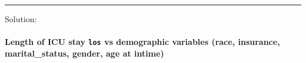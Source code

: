 \documentclass[
]{article}
\let\oldparagraph\paragraph
\renewcommand{\paragraph}[1]{\oldparagraph{#1}\mbox{}}
\begin{document}
\begin{center}\rule{0.5\linewidth}{0.5pt}\end{center}

Solution:

\hypertarget{length-of-icu-stay-los-vs-demographic-variables-race-insurance-marital_status-gender-age-at-intime}{%
\paragraph{\texorpdfstring{Length of ICU stay \texttt{los} vs
demographic variables (race, insurance, marital\_status, gender, age at
intime)}{Length of ICU stay los vs demographic variables (race, insurance, marital\_status, gender, age at intime)}}\label{length-of-icu-stay-los-vs-demographic-variables-race-insurance-marital_status-gender-age-at-intime}}
\end{document}
